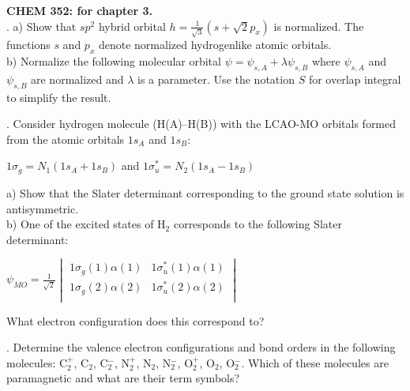 \noindent
\textbf{CHEM 352:
 for chapter 3.}\\

. a) Show that $sp^2$ hybrid orbital $h = \frac{1}{\sqrt{3}}\left( s + \sqrt{2}p_x\right)$ is normalized.
The functions $s$ and $p_x$ denote normalized hydrogenlike atomic orbitals.\\
\phantom{1. }b) Normalize the following molecular orbital $\psi = \psi_{s,A} + \lambda\psi_{s,B}$ where
$\psi_{s,A}$ and $\psi_{s,B}$ are normalized and $\lambda$ is a parameter. Use the notation $S$ for overlap
integral to simplify the result.\\


. Consider hydrogen molecule (H(A)--H(B)) with the LCAO-MO orbitals formed from the atomic orbitals $1s_A$ and $1s_B$:

\begin{center}
$1\sigma_g = N_1\left( 1s_A + 1s_B\right)$ and $1\sigma_u^* = N_2\left( 1s_A - 1s_B\right)$
\end{center}

\vspace{-0.5cm}
\phantom{2. }a) Show that the Slater determinant corresponding to the ground state solution is antisymmetric.\\
\phantom{2. }b) One of the excited states of H$_2$ corresponds to the following Slater determinant:

\begin{center}
$
\psi_{MO} = \frac{1}{\sqrt{2}}\begin{vmatrix}
1\sigma_g(1)\alpha(1) & 1\sigma_u^*(1)\alpha(1)\\
1\sigma_g(2)\alpha(2) & 1\sigma_u^*(2)\alpha(2)\\
\end{vmatrix}
$
\end{center}

\noindent
\phantom{2. b) }What electron configuration does this correspond to?\\


. Determine the valence electron configurations and bond orders in the following molecules:
C$_2^+$, C$_2$, C$_2^-$, N$_2^+$, N$_2$, N$_2^-$, O$_2^+$, O$_2$, O$_2^-$. Which of these
molecules are paramagnetic and what are their term symbols?\\

